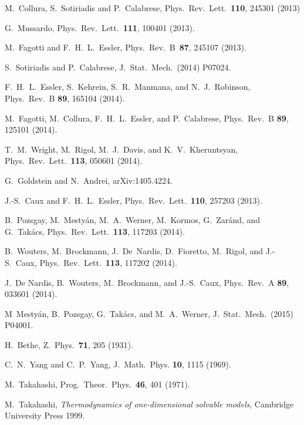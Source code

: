 \documentclass[twocolumn,superscriptaddress,prb,10pt]{revtex4-1}
\begin{document}
\begin{thebibliography}{99}
M.~Collura, S.~Sotiriadis and P.~Calabrese, Phys.\ Rev.\ Lett.\ {\bf 110}, 245301 (2013)

G.~Mussardo, Phys.\ Rev.\ Lett.\ {\bf 111}, 100401 (2013).

M.~Fagotti and F.~H.~L.~Essler, Phys.\ Rev.\ B\ {\bf87}, 245107 (2013).

S.~Sotiriadis and P.~Calabrese, J.\ Stat.\ Mech.\ (2014) P07024. 

F.~H.~L.~Essler, S.~Kehrein, S.~R.~Manmana, and N.~J.~Robinson, Phys.\ Rev.\ B {\bf 89}, 
165104 (2014).

M.~Fagotti, M.~Collura, F.~H.~L.~Essler, and P.~Calabrese, Phys.\ Rev.\ B {\bf 89}, 
125101 (2014).

T.~M.~Wright, M.~Rigol, M.~J.~Davis, and K.~V.~Kheruntsyan, Phys.\ Rev.\ Lett.\ {\bf 113}, 
050601 (2014).

G.~Goldstein and N.~Andrei, arXiv:1405.4224. 



J.-S.~Caux and F.~H.~L.~Essler, Phys.\ Rev.\ Lett.\ {\bf 110}, 
257203 (2013). 

B.~Pozsgay, M.~Mesty\'an, M.~A.~Werner, M.~Kormos, G.~Zar\'and, and G.~Tak\'acs,
Phys.\ Rev.\ Lett.\ {\bf 113}, 117203 (2014). 

B.~Wouters, M.~Brockmann, J.~De~Nardis, D.~Fioretto, M.~Rigol, and J.-S.~Caux, 
Phys.\ Rev.\ Lett.\ {\bf 113}, 117202 (2014). 

J.~De Nardis, B.~Wouters, M.~Brockmann, and J.-S.~Caux, Phys.\ Rev.\ A {\bf 89}, 
033601 (2014). 

M~Mesty\'an, B.~Pozsgay, G.~Tak\'acs, and M.~A.~Werner, J.\ Stat.\ Mech.\ (2015) 
P04001.


H.~Bethe, Z.\ Phys.\ {\bf 71}, 205 (1931). 

C.~N.~Yang and C.~P.~Yang, J.\ Math.\ Phys. {\bf 10}, 1115 (1969).

M.~Takahashi, Prog.\ Theor.\ Phys.\ {\bf 46}, 401 (1971). 

M.~Takahashi, {\it Thermodynamics of one-dimensional solvable models}, 
Cambridge University Press 1999. 


\end{thebibliography}
\end{document}
